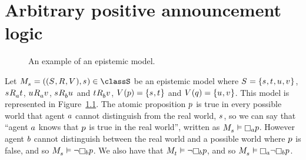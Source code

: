 \chapter{Arbitrary positive announcement logic}\label{papal}

\begin{example}\label{example-el}
    \begin{figure}
        \caption{An example of an epistemic model.}\label{example-epistemic-model}
        \centering
    \end{figure}

    Let $\kPModelAndTuple{\kStateS} \in \classS$ be an epistemic model where
    $\kStates = \{\kStateS, \kStateT, \kStateU, \kStateV\}$,
    $\kStateS \kAccessibility{\agentA} \kStateT$, $\kStateU \kAccessibility{\agentA} \kStateV$, $\kStateS \kAccessibility{\agentB} \kStateU$ and $\kStateT \kAccessibility{\agentB} \kStateV$,
    $\kValuation(\atomP) = \{\kStateS, \kStateT\}$ and $\kValuation(\atomQ) = \{\kStateU, \kStateV\}$.
    This model is represented in Figure~\ref{example-epistemic-model}.
    The atomic proposition $p$ is true in every possible world that agent
    $a$ cannot distinguish from the real world, $\kStateS$, so we can say
    that ``agent $a$ knows that $p$ is true in the real world'',
    written as $\kPModel{\kStateS} \entails \knows[\agentA] \atomP$.
    However agent $b$ cannot distinguish between the real world and a
    possible world where $p$ is false, and so $\kPModel{\kStateS}
    \entails \neg \knows[\agentB] \atomP$. We also have that
    $\kPModel{\kStateT} \entails \neg \knows[\agentB] \atomP$, and so
    $\kPModel{\kStateS} \entails \knows[\agentA] \neg \knows[\agentB]
    \atomP$.
\end{example}

